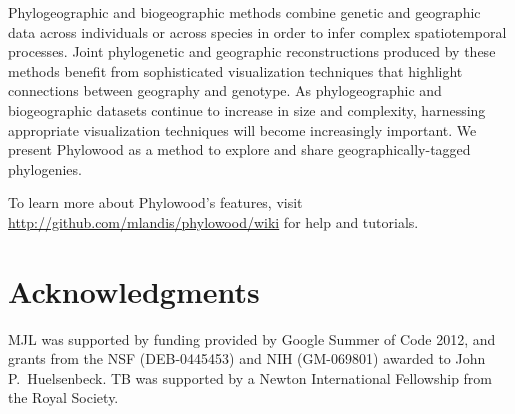 \documentclass[11pt]{article}
\begin{document}
Phylogeographic and biogeographic methods combine genetic and geographic data across individuals or across species in order to infer complex spatiotemporal processes. Joint phylogenetic and geographic reconstructions produced by these methods benefit from sophisticated visualization techniques that highlight connections between geography and genotype. As phylogeographic and biogeographic datasets continue to increase in size and complexity, harnessing appropriate visualization techniques will become increasingly important. We present Phylowood as a method to explore and share geographically-tagged phylogenies. 

To learn more about Phylowood's features, visit \url{http://github.com/mlandis/phylowood/wiki} for help and tutorials.

\section*{Acknowledgments}

MJL was supported by funding provided by Google Summer of Code 2012, and grants from the NSF (DEB-0445453) and NIH (GM-069801) awarded to John P.\ Huelsenbeck.  TB was supported by a Newton International Fellowship from the Royal Society.  



\newpage
\newpage
\end{document}
